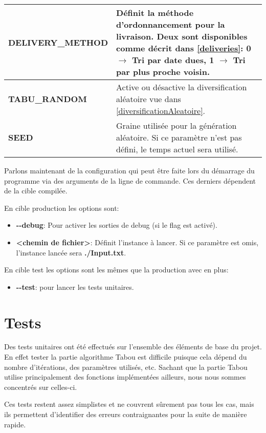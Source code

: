 \documentclass[hideweeklyreports]{polytech/polytech}
\begin{document}
\begin{tabularx}{\textwidth}{|l|X|}
					\textbf{DELIVERY\_METHOD} & Définit la méthode d'ordonnancement pour la livraison. Deux sont disponibles comme décrit dans \autoref{deliveries}:
						0 $\rightarrow$ Tri par date dues, 
						1 $\rightarrow$ Tri par plus proche voisin.
						\\\hline
					\textbf{TABU\_RANDOM} & Active ou désactive la diversification aléatoire vue dans \autoref{diversificationAleatoire}.\\\hline
					\textbf{SEED} & Graine utilisée pour la génération aléatoire. Si ce paramètre n'est pas défini, le temps actuel sera utilisé.\\\hline
				\end{tabularx}		
				
				Parlons maintenant de la configuration qui peut être faite lors du démarrage du programme via des arguments de la ligne de commande. Ces derniers dépendent de la cible compilée.
				
				En cible production les options sont:
				\begin{itemize}
					\item \textbf{-{}-debug}: Pour activer les sorties de debug (si le flag est activé).
					\item \textbf{<chemin de fichier>}: Définit l'instance à lancer. Si ce paramètre est omis, l'instance lancée sera \textbf{./Input.txt}.
				\end{itemize}
				
				En cible test les options sont les mêmes que la production avec en plus:
				\begin{itemize}
					\item \textbf{-{}-test}: pour lancer les tests unitaires.
				\end{itemize}
		
		\section{\label{unit}Tests}
			Des tests unitaires ont été effectués sur l'ensemble des éléments de base du projet. En effet tester la partie algorithme Tabou est difficile puisque cela dépend du nombre d'itérations, des paramètres utilisés, etc. Sachant que la partie Tabou utilise principalement des fonctions implémentées ailleurs, nous nous sommes concentrés sur celles-ci.
			
			Ces tests restent assez simplistes et ne couvrent sûrement pas tous les cas, mais ils permettent d'identifier des erreurs contraignantes pour la suite de manière rapide.
			
\end{document}

